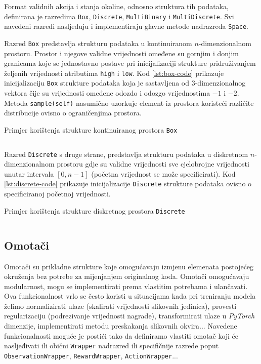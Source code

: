 Format validnih akcija i stanja okoline, odnosno struktura tih podataka, definirana je razredima \texttt{Box}, \texttt{Discrete}, \texttt{MultiBinary} i \texttt{MultiDiscrete}. Svi navedeni razredi nasljeđuju i implementiraju glavne metode nadrazreda \texttt{Space}. 

Razred \texttt{Box} predstavlja strukturu podataka u kontinuiranom $n$-dimenzionalnom prostoru. Prostor i njegove validne vrijednosti omeđene su gornjim i donjim granicama koje se jednostavno postave pri inicijalizaciji strukture pridruživanjem željenih vrijednosti atributima \texttt{high} i \texttt{low}. Kod \ref{lst:box-code} prikazuje inicijalizaciju \texttt{Box} strukture podataka koja je sastavljena od $3$-dimenzionalnog vektora čije su vrijednosti omeđene odozdo i odozgo vrijednostima $-1$ i $-2$. Metoda \texttt{sample(self)} nasumično uzorkuje element iz prostora koristeći različite distribucije ovisno o ograničenjima prostora.

\begin{listing}[H]
    \caption{Primjer korištenja strukture kontinuiranog prostora \texttt{Box}}
    \inputminted{python}{snippets/box.txt}
    \label{lst:box-code}
\end{listing}

Razred \texttt{Discrete} s druge strane, predstavlja strukturu podataka u diskretnom $n$-dimenzionalnom prostoru gdje su validne vrijednosti sve cjelobrojne vrijednosti unutar intervala $[0, n-1]$ (početna vrijednost se može specificirati). Kod \ref{lst:discrete-code} prikazuje inicijalizacije \texttt{Discrete} strukture podataka ovisno o specificiranoj početnoj vrijednosti.

\begin{listing}[H]
    \caption{Primjer korištenja strukture diskretnog prostora \texttt{Discrete}}
    \inputminted{python}{snippets/discrete.txt}
    \label{lst:discrete-code}
\end{listing}

\subsection{Omotači}

Omotači  su prikladne strukture koje omogućavaju izmjenu elemenata postojećeg okruženja bez potrebe za mijenjanjem originalnog koda. Omotači omogućavaju modularnost, mogu se implementirati prema vlastitim potrebama i ulančavati. Ova funkcionalnost vrlo se često koristi u situacijama kada pri treniranju modela želimo normalizirati ulaze (skalirati vrijednosti slikovnih jedinica), provesti regularizaciju (podrezivanje vrijednosti nagrade), transformirati ulaze u \textit{PyTorch} dimenzije, implementirati metodu preskakanja slikovnih okvira...  Navedene funkcionalnosti moguće je postići tako da definiramo vlastiti omotač koji će nasljeđivati ili obični \texttt{Wrapper} nadrazred ili specifičnije razrede poput \texttt{ObservationWrapper}, \texttt{RewardWrapper}, \texttt{ActionWrapper}...

